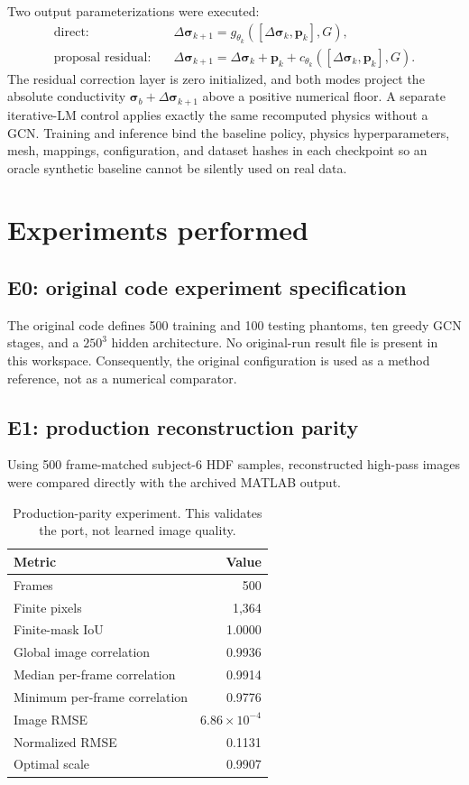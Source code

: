 \documentclass[11pt]{article}
\newcommand{\sig}{\bm{\sigma}}
\newcommand{\dsig}{\Delta\bm{\sigma}}
\begin{document}
Two output parameterizations were executed:
\begin{align}
  \text{direct:}\quad &\dsig_{k+1}=g_{\theta_k}([\dsig_k,\bm p_k],G),\\
  \text{proposal residual:}\quad &\dsig_{k+1}=\dsig_k+\bm p_k
  +c_{\theta_k}([\dsig_k,\bm p_k],G).
\end{align}
The residual correction layer is zero initialized, and both modes project the
absolute conductivity $\sig_b+\dsig_{k+1}$ above a positive numerical floor.
A separate iterative-LM control applies exactly the same recomputed physics without
a GCN.  Training and inference bind the baseline policy, physics hyperparameters,
mesh, mappings, configuration, and dataset hashes in each checkpoint so an oracle
synthetic baseline cannot be silently used on real data.

\section{Experiments performed}

\subsection{E0: original code experiment specification}

The original code defines 500 training and 100 testing phantoms, ten greedy GCN
stages, and a $250^3$ hidden architecture.  No original-run result file is present
in this workspace.  Consequently, the original configuration is used as a method
reference, not as a numerical comparator.

\subsection{E1: production reconstruction parity}

Using 500 frame-matched subject-6 HDF samples, reconstructed high-pass images were
compared directly with the archived MATLAB output.

\begin{table}[H]
\centering
\caption{Production-parity experiment.  This validates the port, not learned image quality.}
\label{tab:parity}
\begin{tabular}{@{}lr@{}}
\toprule
Metric & Value \\
\midrule
Frames & 500 \\
Finite pixels & 1,364 \\
Finite-mask IoU & 1.0000 \\
Global image correlation & 0.9936 \\
Median per-frame correlation & 0.9914 \\
Minimum per-frame correlation & 0.9776 \\
Image RMSE & $6.86\times10^{-4}$ \\
Normalized RMSE & 0.1131 \\
Optimal scale & 0.9907 \\
\bottomrule
\end{tabular}
\end{table}
\end{document}
